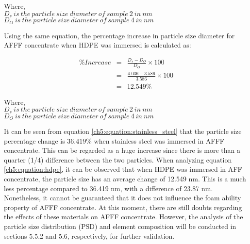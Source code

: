 \begin{doublespace}
Where, \\
$D_s\ is\ the\ particle\ size\ diameter\ of\ sample\ 2\ in\ nm$ \\
$D_O\ is\ the\ particle\ size\ diameter\ of\ sample\ 4\ in\ nm$ \\
\end{doublespace}

Using the same equation, the percentage increase in particle size diameter for AFFF concentrate when HDPE was immersed is calculated as:  

\begin{doublespace}
\begin{eqnarray}
    \%Increase &=& \frac{D_s - D_O}{D_O} \times 100 \\ 
    \nonumber &=& \frac{4.036 - 3.586}{3.586}\times 100 \\
    \nonumber &=& 12.549\% 
    \label{ch5:equation:hdpe}
\end{eqnarray}
\end{doublespace}
 
\begin{doublespace}
Where, \\
$D_s\ is\ the\ particle\ size\ diameter\ of\ sample\ 2\ in\ nm$ \\
$D_O\ is\ the\ particle\ size\ diameter\ of\ sample\ 4\ in\ nm$ \\
\end{doublespace}

It can be seen from equation \ref{ch5:equation:stainless_steel} that the particle size percentage change is 36.419\% when stainless steel was immersed in AFFF concentrate. This can be regarded as a huge increase since there is more than a quarter (1/4) difference between the two particles. When analyzing equation \ref{ch5:equation:hdpe}, it can be observed that when HDPE was immersed in AFF concentrate, the particle size has an average change of 12.549 nm. This is a much less percentage compared to 36.419 nm, with a difference of 23.87 nm. Nonetheless, it cannot be guaranteed that it does not influence the foam ability property of AFFF concentrate.  At this moment, there are still doubts regarding the effects of these materials on AFFF concentrate. However, the analysis of the particle size distribution (PSD) and element composition will be conducted in sections 5.5.2 and 5.6, respectively, for further validation.

